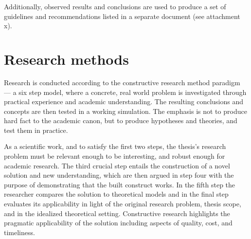 \documentclass[12pt,a4paper,oneside,pdftex]{report}
\begin{document}
Additionally, observed results and conclusions are used to produce a set of guidelines and recommendations listed in a separate document (see attachment x). %


\section{Research methods}
Research is conducted according to the constructive research method paradigm --- a six step model, where a concrete, real world problem is investigated through practical experience and academic understanding. The resulting conclusions and concepts are then tested in a working simulation. The emphasis is not to produce hard fact to the academic canon, but to produce hypotheses and theories, and test them in practice.

As a scientific work, and to satisfy the first two steps, the thesis's research problem must be relevant enough to be interesting, and robust enough for academic research. The third crucial step entails the construction of a novel solution and new understanding, which are then argued in step four with the purpose of demonstrating that the built construct works. In the fifth step the researcher compares the solution to theoretical models and in the final step evaluates its applicability in light of the original research problem, thesis scope, and in the idealized theoretical setting. Constructive research highlights the pragmatic applicability of the solution including aspects of quality, cost, and timeliness.

\begin{comment}
Below to reference works from SoberIT slideset.

Kasanen, Eero, Lukka Kari, and Arto Siitonen. 1993. The Constructive Approach in Management Accounting Research. Journal of Management Accounting Research, 5 (1), pp. 243-263.

Shaw, M. 2001. The Coming-of-Age of Software Architecture Research. Proceedings of ICSE-2001, pp. 657-664. Los Alamitos, CA: IEEE Computer Society Press.
\end{comment}

\end{document}
